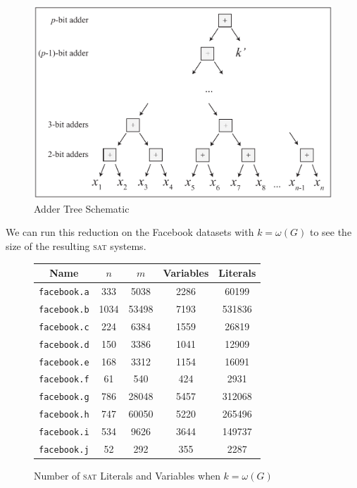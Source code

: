 \documentclass[]{article}
\newcommand{\sat}{\textsc{sat}}
\begin{document}
		\begin{figure}[H]
			\caption{Adder Tree Schematic}
			\includegraphics[width=4.5 in]{adder-tree}
			\centering
		\end{figure}

	We can run this reduction on the Facebook datasets with $k = \omega(G)$ to see the size of the resulting \sat{} systems.

	\begin{figure}[H]
		\centering
		\caption{Number of \sat{} Literals and Variables when $k = \omega(G)$}
		\begin{tabular}{|c|c|c|c|c|}
			\hline
			Name                & $n$  & $m$   & Variables & Literals \\ \hline
			\texttt{facebook.a} & 333  & 5038  & 2286      & 60199    \\ \hline
			\texttt{facebook.b} & 1034 & 53498 & 7193      & 531836   \\ \hline
			\texttt{facebook.c} & 224  & 6384  & 1559      & 26819    \\ \hline
			\texttt{facebook.d} & 150  & 3386  & 1041      & 12909    \\ \hline
			\texttt{facebook.e} & 168  & 3312  & 1154      & 16091    \\ \hline
			\texttt{facebook.f} & 61   & 540   & 424       & 2931     \\ \hline
			\texttt{facebook.g} & 786  & 28048 & 5457      & 312068   \\ \hline
			\texttt{facebook.h} & 747  & 60050 & 5220      & 265496   \\ \hline
			\texttt{facebook.i} & 534  & 9626  & 3644      & 149737   \\ \hline
			\texttt{facebook.j} & 52   & 292   & 355       & 2287     \\ \hline
		\end{tabular}
	\end{figure}
	
\end{document}
